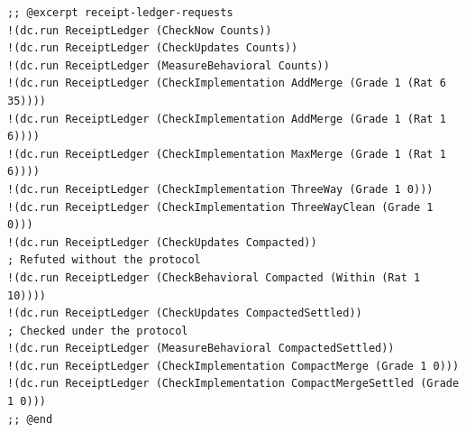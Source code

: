 \documentclass[11pt]{article}
\theoremstyle{definition}
\theoremstyle{plain}
\begin{document}
\begin{lstlisting}[style=mettafull]
;; @excerpt receipt-ledger-requests
!(dc.run ReceiptLedger (CheckNow Counts))
!(dc.run ReceiptLedger (CheckUpdates Counts))
!(dc.run ReceiptLedger (MeasureBehavioral Counts))
!(dc.run ReceiptLedger (CheckImplementation AddMerge (Grade 1 (Rat 6 35))))
!(dc.run ReceiptLedger (CheckImplementation AddMerge (Grade 1 (Rat 1 6))))
!(dc.run ReceiptLedger (CheckImplementation MaxMerge (Grade 1 (Rat 1 6))))
!(dc.run ReceiptLedger (CheckImplementation ThreeWay (Grade 1 0)))
!(dc.run ReceiptLedger (CheckImplementation ThreeWayClean (Grade 1 0)))
!(dc.run ReceiptLedger (CheckUpdates Compacted))                        ; Refuted without the protocol
!(dc.run ReceiptLedger (CheckBehavioral Compacted (Within (Rat 1 10))))
!(dc.run ReceiptLedger (CheckUpdates CompactedSettled))                 ; Checked under the protocol
!(dc.run ReceiptLedger (MeasureBehavioral CompactedSettled))
!(dc.run ReceiptLedger (CheckImplementation CompactMerge (Grade 1 0)))
!(dc.run ReceiptLedger (CheckImplementation CompactMergeSettled (Grade 1 0)))
;; @end
\end{lstlisting}
\end{document}
